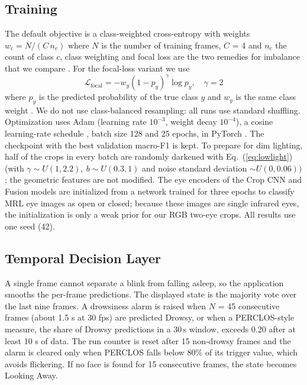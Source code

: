 \documentclass[conference]{IEEEtran}
\begin{document}
\subsection{Training}\label{sec:train}
The default objective is a class-weighted cross-entropy with weights
$w_c = N/(C\,n_c)$ where $N$ is the number of training frames, $C$ = 4 and $n_c$ the count of class $c$, class weighting and focal loss are the two remedies for imbalance that we compare \cite{lin2017,ghosh2024}. For the focal-loss variant we use
\begin{equation}
\mathcal{L}_{\text{focal}} = -w_y (1-p_y)^\gamma \log p_y,
\quad \gamma = 2
\label{eq:focal_loss}
\end{equation}
where $p_y$ is the predicted probability of the true class $y$ and $w_y$ is the same class weight \cite{lin2017}. We do not use class-balanced resampling: all runs use standard shuffling. Optimization uses Adam \cite{kingma2015} (learning rate $10^{-3}$, weight decay $10^{-4}$), a cosine learning-rate schedule \cite{loshchilov2017}, batch size 128 and 25 epochs, in PyTorch \cite{paszke2019}. The checkpoint with the best validation macro-F1 is kept. To prepare for dim lighting, half of the crops in every batch are randomly darkened with Eq.~(\ref{eq:lowlight}) (with $\gamma \sim U(1, 2.2),\ b \sim U(0.3, 1)$ and noise standard deviation $\sim U(0, 0.06))$; the geometric features are not modified.
The eye encoders of the Crop CNN and Fusion models are initialized from a network trained for three epochs to classify MRL eye images as open or closed; because these images are single infrared eyes, the initialization is only a weak prior for our RGB two-eye crops. All results use one seed (42).

\subsection{Temporal Decision Layer}\label{sec:temporal}
A single frame cannot separate a blink from falling asleep, so the application smooths the per-frame predictions. The displayed state is the majority vote over the last nine frames. A drowsiness alarm is raised when $N$ = 45 consecutive frames (about 1.5 s at 30 fps) are predicted Drowsy, or when a PERCLOS-style measure, the share of Drowsy predictions in a 30\,s window, exceeds 0.20 after at least 10 s of data. The run counter is reset after 15 non-drowsy frames and the alarm is cleared only when PERCLOS falls below 80\% of its trigger value, which avoids flickering. If no face is found for 15 consecutive frames, the state becomes Looking Away.
\end{document}
